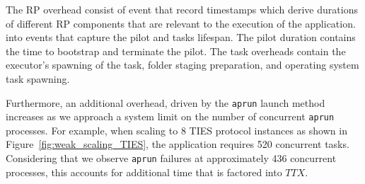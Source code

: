 The RP overhead consist of event that record timestamps which derive
durations of different RP components that are relevant to the execution of the 
application.  into events  that
capture the pilot and tasks lifespan. The pilot duration contains the time to
bootstrap and terminate the pilot. The task overheads contain the executor's
spawning of the task, folder staging preparation, and operating system task
spawning.  


Furthermore, an additional overhead, driven by the \texttt{aprun}  
launch method increases as we approach a system limit on the number of 
concurrent 
\texttt{aprun} processes. For example, when scaling to 8 TIES protocol instances 
as shown in Figure~\ref{fig:weak_scaling_TIES}, the application requires 520 
concurrent tasks. Considering that we observe \texttt{aprun} failures at 
approximately 436 concurrent processes, this accounts for additional time
that is factored into \(TTX\).  




